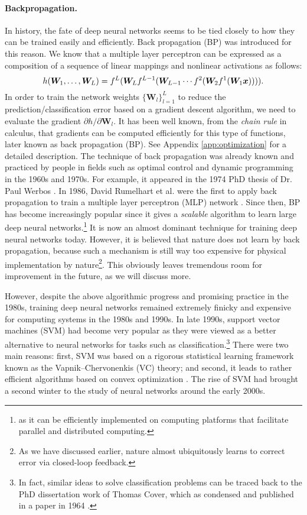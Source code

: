 \documentclass[\toplevelprefix/book-main.tex]{subfiles}
\begin{document}
\paragraph{Backpropagation.}
In history, the fate of deep neural networks seems to be tied closely to how they can be trained easily and efficiently. Back propagation (BP) was introduced for this reason. We know that a multiple layer perceptron can be expressed as a  composition of a sequence of linear mappings and nonlinear activations as follows:
\begin{equation}
h(\bm W_1, \ldots, \bm W_L) = f^L(\bm W_Lf^{L-1}(\bm W_{L-1} \cdots f^2(\bm W_2f^1(\bm W_1\bm{x})))).
\end{equation}
In order to train the network weights $\{\bm W_l\}_{l=1}^L$ to reduce the prediction/classification error based on a gradient descent algorithm, we need to evaluate the gradient ${\partial h}/{\partial \bm W_l}$. It has been well known, from the {\em chain rule} in calculus, that gradients can be computed efficiently for this type of functions, later known as back propagation (BP). See Appendix \ref{app:optimization} for a detailed description. The technique of back propagation was already known and practiced by people in fields such as optimal control and dynamic programming in the 1960s and 1970s. For example, it appeared in the 1974 PhD thesis of Dr. Paul Werbos \cite{Werbos-1974, Werbos1994TheRO}. In 1986, David Rumelhart et al. were the first to apply back propagation  to train a multiple layer perceptron (MLP) network \cite{Rumelhart1986}. Since then,  BP has become increasingly popular since it gives a {\em scalable} algorithm to learn large deep neural networks.\footnote{as it can be efficiently implemented on computing platforms that facilitate parallel and distributed computing.} It is now an almost dominant technique for training deep neural networks today. However, it is believed that nature does not learn by back propagation,  because such a mechanism is still way too expensive for physical implementation by nature\footnote{As we have discussed earlier, nature almost ubiquitously learns to correct error via closed-loop feedback.}. This obviously leaves tremendous room for improvement in the future, as we will discuss more.

However, despite the above algorithmic progress and promising practice in the 1980s, training deep neural networks remained extremely finicky and expensive for computing systems in the 1980s and 1990s. In late 1990s, support vector machines (SVM) \cite{SVM-1995} had become very popular as they were viewed as a better alternative to neural networks for tasks such as classification.\footnote{In fact, similar ideas to solve classification problems can be traced back to the PhD dissertation work of Thomas Cover, which as condensed and published in a paper in 1964  \cite{Cover-1964}.} There were two main reasons: first, SVM was based on a rigorous statistical learning framework known as the Vapnik--Chervonenkis (VC) theory; and second, it leads to rather efficient algorithms based on convex optimization \cite{BoydVa04}. The rise of SVM had brought a second winter to the study of neural networks around the early 2000s. 
\end{document}
